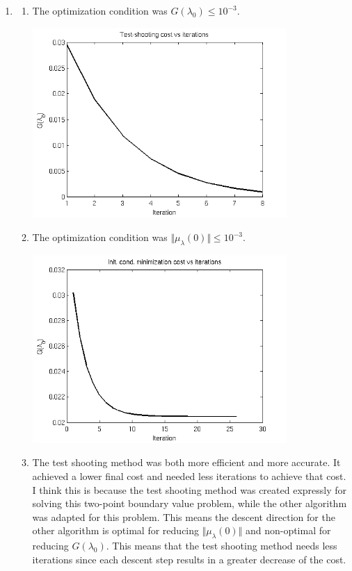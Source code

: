 \documentclass[letterpaper,11pt,titlepage]{article}
\begin{document}
\begin{enumerate}[leftmargin=0pt]
  \clearpage
\item \begin{enumerate}
  \item The optimization condition was $G(\lambda_0)\le 10^{-3}$.
    \begin{center}
      \includegraphics[width=0.8\textwidth]{hw3p3a}
    \end{center}
  \item The optimization condition was $\Vert \mu_\lambda(0) \Vert \le 10^{-3}$.
    \begin{center}
      \includegraphics[width=0.8\textwidth]{hw3p3b}
    \end{center}
  \item The test shooting method was both more efficient and more accurate. It achieved a lower final cost and needed less iterations to achieve that cost. I think this is because the test shooting method was created expressly for solving this two-point boundary value problem, while the other algorithm was adapted for this problem. This means the descent direction for the other algorithm is optimal for reducing $\Vert\mu_\lambda(0)\Vert$ and non-optimal for reducing $G(\lambda_0)$. This means that the test shooting method needs less iterations since each descent step results in a greater decrease of the cost.


\end{enumerate}
\end{enumerate}
\end{document}
